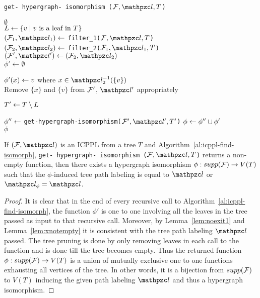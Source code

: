 \begin{algorithm}[h]
  \caption{{\tt get- hypergraph- isomorphism ($\cF, \cl, T$)}}
  \label{al:icppl-find-isomorph}
  \begin{algorithmic}[\lndisplay]

    \RETURN $\emptyset$\\
    \ENDIF
    \STATE $L \leftarrow \{v \mid v \text{ is a leaf in }      T\}$\\
    \STATE $(\cF_1, \cl_1) \assign$ {\tt filter\_1($\cF, \cl,
      T$)}\\
    \STATE $(\cF_2, \cl_2) \assign$ {\tt filter\_2($\cF_1,
      \cl_1, T$)}\\

    \STATE $(\cF', \cl') \assign (\cF_2, \cl_2)$\\
    \STATE $\phi' \leftarrow \emptyset$

     \STATE $\phi'(x) \leftarrow v$ where $x \in
    \cl_2^{-1}(\{v\})$ \\
    \STATE Remove $\{x\}$ and $\{v\}$ from ${\cal F}'$, $\cl'$  appropriately\\
    \ENDFOR

    \STATE $T' \leftarrow T \setminus L$

    \STATE $\phi'' \leftarrow$ {\tt get-hypergraph-isomorphism($\cF',
      \cl', T'$)}
    \STATE $\phi \leftarrow \phi'' \cup \phi'$ \\
    \RETURN $\phi$
  \end{algorithmic}
\end{algorithm}

\begin{lemma}
  \label{lem:hyperiso} %
  If $(\cF, \cl)$ is an ICPPL from a tree $T$ and
  Algorithm~\ref{al:icppl-find-isomorph}, {\tt get- hypergraph-
    isomorphism ($\cF, \cl, T$)} returns a non-empty function, then
  there exists a hypergraph isomorphism $\phi : supp({\cal F}) \rightarrow
  V(T)$ such that the $\phi$-induced tree path labeling is equal to
  $\cl$ or $\cl_\phi = \cl$.
\end{lemma}
\begin{proof}
  It is clear that in the end of every recursive call to
  Algorithm~\ref{al:icppl-find-isomorph}, the function $\phi'$ is one
  to one involving all the leaves in the tree passed as input to that
  recursive call. Moreover, by Lemma~\ref{lem:noexit1} and
  Lemma~\ref{lem:xnotempty} it is consistent with the tree path
  labeling $\cl$ passed. The tree pruning is done by only removing
  leaves in each call to the function and is done till the tree
  becomes empty. Thus the returned function $\phi: supp({\cal F})
  \rightarrow V(T)$ is a union of mutually exclusive one to one
  functions exhausting all vertices of the tree. In other words, it is
  a bijection from $supp({\cal F})$ to $V(T)$ inducing the given path
  labeling $\cl$ and thus a hypergraph isomorphism. %
\end{proof}

